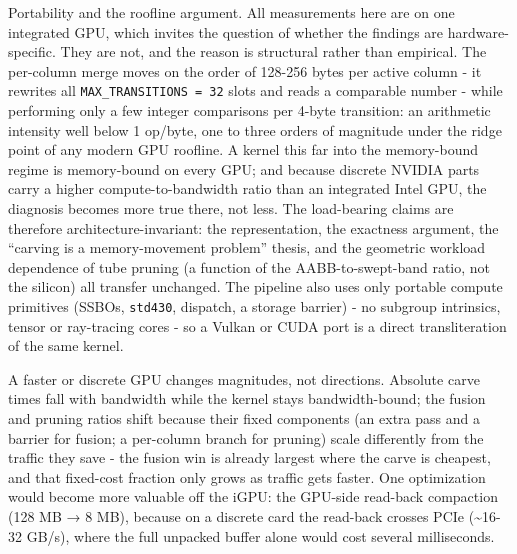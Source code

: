 \documentclass[
]{article}
\begin{document}
Portability and the roofline argument. All measurements here are on one
integrated GPU, which invites the question of whether the findings are
hardware-specific. They are not, and the reason is structural rather
than empirical. The per-column merge moves on the order of 128-256 bytes
per active column - it rewrites all \texttt{MAX\_TRANSITIONS\ =\ 32}
slots and reads a comparable number - while performing only a few
integer comparisons per 4-byte transition: an arithmetic intensity well
below 1 op/byte, one to three orders of magnitude under the ridge point
of any modern GPU roofline. A kernel this far into the memory-bound
regime is memory-bound on every GPU; and because discrete NVIDIA parts
carry a higher compute-to-bandwidth ratio than an integrated Intel GPU,
the diagnosis becomes more true there, not less. The load-bearing claims
are therefore architecture-invariant: the representation, the exactness
argument, the ``carving is a memory-movement problem'' thesis, and the
geometric workload dependence of tube pruning (a function of the
AABB-to-swept-band ratio, not the silicon) all transfer unchanged. The
pipeline also uses only portable compute primitives (SSBOs,
\texttt{std430}, dispatch, a storage barrier) - no subgroup intrinsics,
tensor or ray-tracing cores - so a Vulkan or CUDA port is a direct
transliteration of the same kernel.

A faster or discrete GPU changes magnitudes, not directions. Absolute
carve times fall with bandwidth while the kernel stays bandwidth-bound;
the fusion and pruning ratios shift because their fixed components (an
extra pass and a barrier for fusion; a per-column branch for pruning)
scale differently from the traffic they save - the fusion win is already
largest where the carve is cheapest, and that fixed-cost fraction only
grows as traffic gets faster. One optimization would become more
valuable off the iGPU: the GPU-side read-back compaction (128 MB → 8
MB), because on a discrete card the read-back crosses PCIe
(\textasciitilde16-32 GB/s), where the full unpacked buffer alone would
cost several milliseconds.
\end{document}
